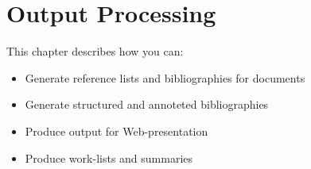 
\chapter{Output Processing}
\label{cha:uoutput}

This chapter describes how you can:
\begin{itemize}
\item Generate reference lists and bibliographies for documents
\item Generate structured and annoteted bibliographies
\item Produce output for Web-presentation
\item Produce work-lists and summaries
\end{itemize}





